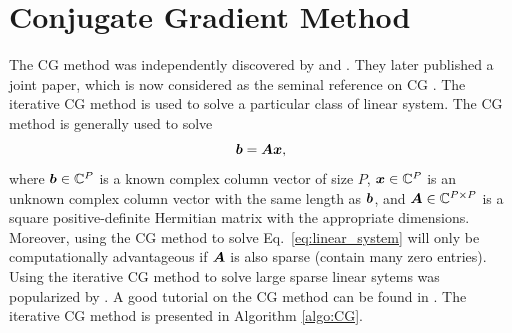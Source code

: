 \documentclass[useAMS,usenatbib]{mn2e}
\newcommand{\bA}{\bmath{A}}
\newcommand{\br}{\bmath{r}}
\newcommand{\bb}{\bmath{b}}
\newcommand{\bx}{\bmath{x}}
\newcommand{\bp}{\bmath{p}}
\begin{document}
\section{Conjugate Gradient Method}
\label{sec:conj_grad}
The CG method was independently discovered by \citet{Hestenes1973} and \citet{Stiefel1952}. They later published a joint paper, which is now considered as the seminal
reference on CG \citep{Hestenes1952}. The iterative CG method is used to solve a particular class of linear system. The CG method is generally used to solve
\begin{equation}
\label{eq:linear_system}
\bb = \bA\bx,
\end{equation}
where $\bb\in\mathbb{C}^P$ is a known complex column vector of size $P$, $\bx\in\mathbb{C}^P$ is an unknown complex column vector with the same length as $\bb$, and $\bA\in\mathbb{C}^{P\times P}$ is a square positive-definite Hermitian matrix with the appropriate dimensions.  
Moreover, using the CG method to solve Eq.~\eqref{eq:linear_system} will only be computationally advantageous if $\bA$ is also sparse (contain many zero entries).
Using the iterative CG method to solve large sparse linear sytems was popularized by \citet{Reid1971}. A good tutorial on the CG method can be found in \citep{Shewchuk1994}.
The iterative CG method is presented in Algorithm \ref{algo:CG}. 


\end{document}
